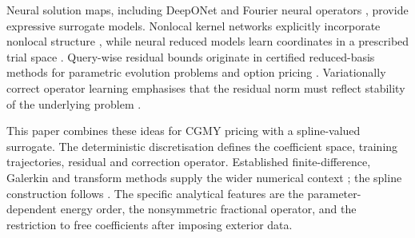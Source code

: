 \documentclass[11pt]{amsart}
\theoremstyle{remark}
\begin{document}
Neural solution maps, including DeepONet \cite{LuJinPangZhangKarniadakis2021}
and Fourier neural operators \cite{LiKovachkiEtAl2021,KovachkiEtAl2023},
provide expressive surrogate models. Nonlocal kernel networks explicitly
incorporate nonlocal structure \cite{YouYuDEliaGaoSilling2022}, while neural
reduced models learn coordinates in a prescribed trial space
\cite{HesthavenUbbiali2018,BhattacharyaEtAl2021}. Query-wise residual bounds
originate in certified reduced-basis methods for parametric evolution
problems \cite{GreplPatera2005,RozzaHuynhPatera2008,HaasdonkOhlberger2008}
and option pricing \cite{ContLantosPironneau2011}. Variationally correct
operator learning emphasises that the residual norm must reflect stability
of the underlying problem \cite{QiuDahmenChen2026}.

This paper combines these ideas for CGMY pricing with a spline-valued
surrogate. The deterministic discretisation defines the coefficient space,
training trajectories, residual and correction operator. Established
finite-difference, Galerkin and transform methods supply the wider numerical
context \cite{ContVoltchkova2005,MatacheVonPetersdorffSchwab2004,
HilberReichmannSchwabWinter2013,FangOosterlee2008}; the spline construction
follows \cite{DamircheliCGMY2026}. The specific analytical features are the
parameter-dependent energy order, the nonsymmetric fractional operator,
and the restriction to free coefficients after imposing exterior data.
\end{document}
